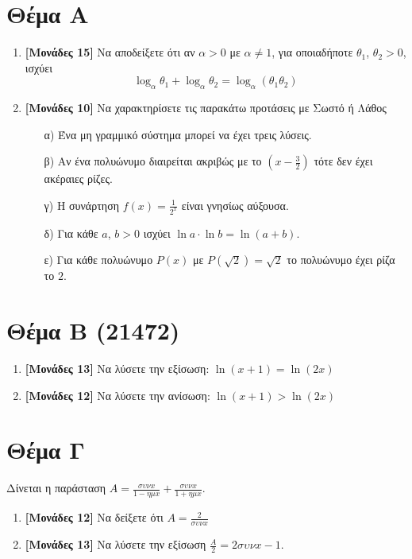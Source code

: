 \documentclass[12pt]{article}
\begin{document}
\section*{Θέμα Α}
  \noindent
  \begin{enumerate}
    \item \textbf{[Μονάδες 15]} Να αποδείξετε ότι αν $α>0$ με $α \ne 1$, για οποιαδήποτε $θ_1$, $θ_2>0$, ισχύει $$\log_α θ_1+\log_α θ_2=\log_α(θ_1 θ_2)$$
    \item \textbf{[Μονάδες 10]}  Να χαρακτηρίσετε τις παρακάτω προτάσεις με Σωστό ή Λάθος
    \begin{enumerate}
      \item [α)] Ένα μη γραμμικό σύστημα μπορεί να έχει τρεις λύσεις.
      \item [β)] Αν ένα πολυώνυμο διαιρείται ακριβώς με το $\left(x-\frac{3}{2}\right)$ τότε δεν έχει ακέραιες ρίζες.
      \item [γ)] Η συνάρτηση $f(x)=\frac{1}{2^x}$ είναι γνησίως αύξουσα.
      \item [δ)] Για κάθε $a$, $b>0$ ισχύει $\ln a \cdot \ln b = \ln(a+b)$.
      \item [ε)] Για κάθε πολυώνυμο $P(x)$ με $P(\sqrt{2})=\sqrt{2}$ το πολυώνυμο έχει ρίζα το $2$.
    \end{enumerate}
  \end{enumerate}

\section*{Θέμα Β (21472)}
  \noindent
\begin{enumerate}
  \item \textbf{[Μονάδες 13]}  Να λύσετε την εξίσωση: $\ln(x+1)=\ln(2x)$
  \item \textbf{[Μονάδες 12]}  Να λύσετε την ανίσωση: $\ln(x+1)>\ln(2x)$
\end{enumerate}

\section*{Θέμα Γ}
  \noindent

  Δίνεται η παράσταση $Α=\frac{συνx}{1-ημx}+\frac{συνx}{1+ημx}$.
  \begin{enumerate}
    \item \textbf{[Μονάδες 12]}  Να δείξετε ότι $Α=\frac{2}{συνx}$
    \item \textbf{[Μονάδες 13]}  Να λύσετε την εξίσωση $\frac{Α}{2}=2συνx-1$.
  \end{enumerate}
\end{document}
